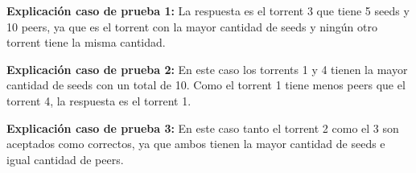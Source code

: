 \documentclass{oci}
\begin{document}
\begin{sampleDescription}
\begin{center}
    \begin{minipage}{0.95\textwidth}
    \textbf{Explicación caso de prueba 1:} La respuesta es el torrent 3 que tiene 5 seeds y 10 peers,
    ya que es el torrent con la mayor cantidad de seeds y ningún otro torrent tiene la misma cantidad.
    \end{minipage}
\end{center}
\begin{center}
    \begin{minipage}{0.95\textwidth}
    \textbf{Explicación caso de prueba 2:} En este caso los torrents 1 y 4 tienen la mayor cantidad
    de seeds con un total de 10.
    Como el torrent 1 tiene menos peers que el torrent 4, la respuesta es el torrent 1.
    \end{minipage}
\end{center}
\begin{center}
    \begin{minipage}{0.95\textwidth}
    \textbf{Explicación caso de prueba 3:} En este caso tanto el torrent 2 como el 3 son aceptados
    como correctos, ya que ambos tienen la mayor cantidad de seeds e igual cantidad de peers.
    \end{minipage}
\end{center}

\end{sampleDescription}
\end{document}
